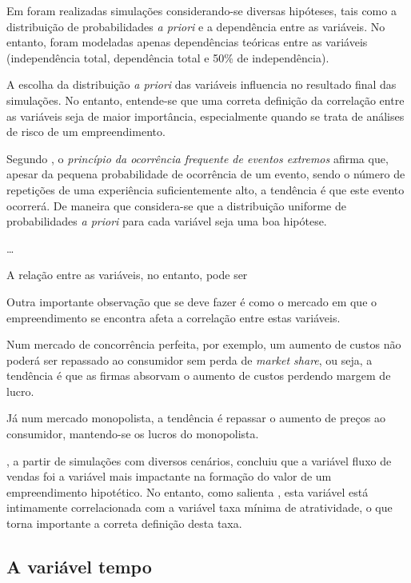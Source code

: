 \documentclass[
	12pt,				%
	oneside,			%
	a4paper,			%
	chapter=TITLE,		%
	section=TITLE,		%
	english,			%
	brazil				%
	]{abntex2}
\begin{document}
Em \textcite{gahochheim} foram realizadas simulações considerando-se
diversas hipóteses, tais como a distribuição de probabilidades \emph{a
priori} e a dependência entre as variáveis. No entanto, foram modeladas
apenas dependências teóricas entre as variáveis (independência total,
dependência total e 50\% de independência).

A escolha da distribuição \emph{a priori} das variáveis influencia no
resultado final das simulações. No entanto, entende-se que uma correta
definição da correlação entre as variáveis seja de maior importância,
especialmente quando se trata de análises de risco de um empreendimento.

Segundo \textcite{matloff2017}, o \emph{princípio da ocorrência
frequente de eventos extremos} afirma que, apesar da pequena
probabilidade de ocorrência de um evento, sendo o número de repetições
de uma experiência suficientemente alto, a tendência é que este evento
ocorrerá. De maneira que considera-se que a distribuição uniforme de
probabilidades \emph{a priori} para cada variável seja uma boa hipótese.

\ldots{}

A relação entre as variáveis, no entanto, pode ser

Outra importante observação que se deve fazer é como o mercado em que o
empreendimento se encontra afeta a correlação entre estas variáveis.

Num mercado de concorrência perfeita, por exemplo, um aumento de custos
não poderá ser repassado ao consumidor sem perda de \emph{market share},
ou seja, a tendência é que as firmas absorvam o aumento de custos
perdendo margem de lucro.

Já num mercado monopolista, a tendência é repassar o aumento de preços
ao consumidor, mantendo-se os lucros do monopolista.

\textcite{gahochheim}, a partir de simulações com diversos cenários,
concluiu que a variável fluxo de vendas foi a variável mais impactante
na formação do valor de um empreendimento hipotético. No entanto, como
salienta \textcites{gahochheim}[119]{gahochheim}, esta variável está
intimamente correlacionada com a variável taxa mínima de atratividade, o
que torna importante a correta definição desta taxa.

\subsection{A variável tempo}\label{a-variuxe1vel-tempo}
\end{document}
